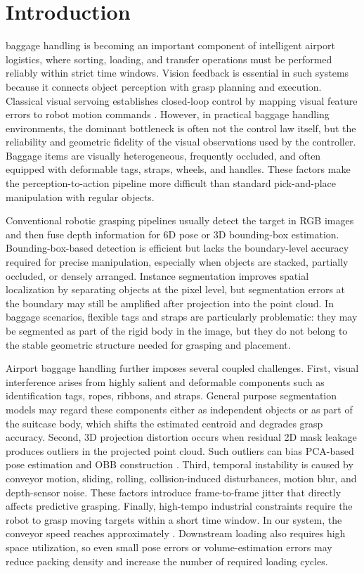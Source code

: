 \section{Introduction}
 baggage handling is becoming an important component of intelligent airport logistics, where sorting, loading, and transfer operations must be performed reliably within strict time windows. Vision feedback is essential in such systems because it connects object perception with grasp planning and execution. Classical visual servoing establishes closed-loop control by mapping visual feature errors to robot motion commands \cite{hutchinson2002tutorial}. However, in practical baggage handling environments, the dominant bottleneck is often not the control law itself, but the reliability and geometric fidelity of the visual observations used by the controller. Baggage items are visually heterogeneous, frequently occluded, and often equipped with deformable tags, straps, wheels, and handles. These factors make the perception-to-action pipeline more difficult than standard pick-and-place manipulation with regular objects.

Conventional robotic grasping pipelines usually detect the target in RGB images and then fuse depth information for 6D pose or 3D bounding-box estimation. Bounding-box-based detection is efficient but lacks the boundary-level accuracy required for precise manipulation, especially when objects are stacked, partially occluded, or densely arranged. Instance segmentation improves spatial localization by separating objects at the pixel level, but segmentation errors at the boundary may still be amplified after projection into the point cloud. In baggage scenarios, flexible tags and straps are particularly problematic: they may be segmented as part of the rigid body in the image, but they do not belong to the stable geometric structure needed for grasping and placement.

Airport baggage handling further imposes several coupled challenges. First, visual interference arises from highly salient and deformable components such as identification tags, ropes, ribbons, and straps. General purpose segmentation models \cite{he2017mask} may regard these components either as independent objects or as part of the suitcase body, which shifts the estimated centroid and degrades grasp accuracy. Second, 3D projection distortion occurs when residual 2D mask leakage produces outliers in the projected point cloud. Such outliers can bias PCA-based pose estimation and OBB construction \cite{rusu20113d, gottschalk1996obbtree}. Third, temporal instability is caused by conveyor motion, sliding, rolling, collision-induced disturbances, motion blur, and depth-sensor noise. These factors introduce frame-to-frame jitter that directly affects predictive grasping. Finally, high-tempo industrial constraints require the robot to grasp moving targets within a short time window. In our system, the conveyor speed reaches approximately . Downstream loading also requires high space utilization, so even small pose errors or volume-estimation errors may reduce packing density and increase the number of required loading cycles.

